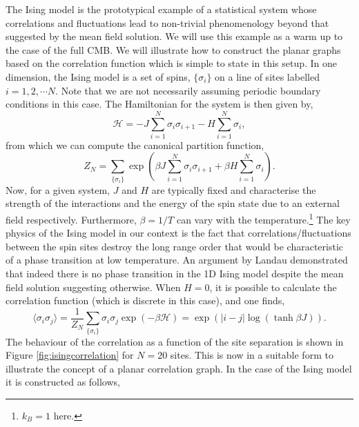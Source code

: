 \documentclass[11pt]{article}
\numberwithin{equation}{section}
\numberwithin{figure}{section}
\numberwithin{table}{section}
\numberwithin{definition}{section}
\newcommand{\Abs}[1]{\left| #1 \right|}
\begin{document}
The Ising model is the prototypical example of a statistical system whose correlations and fluctuations lead to non-trivial phenomenology beyond that suggested by the mean field solution. We will use this example as a warm up to the case of the full CMB. We will illustrate how to construct the planar graphs based on the correlation function which is simple to state in this setup. In one dimension, the Ising model is a set of spins, $\{\sigma_i\}$ on a line of sites labelled $i = 1, 2, \cdots N$. Note that we are not necessarily assuming periodic boundary conditions in this case. The Hamiltonian for the system is then given by,
\begin{equation}
\mathcal{H} = -J \sum_{i = 1}^{N}{\sigma_i \sigma_{i + 1}} - H \sum_{i = 1}^{N}{\sigma_i},
\end{equation}
from which we can compute the canonical partition function,
\begin{equation}
Z_N = \sum_{\{\sigma_i\}}{\exp\left(\beta J \sum_{i = 1}^{N}{\sigma_i \sigma_{i + 1}} + \beta H\sum_{i = 1}^{N}{\sigma_i}\right)}.
\end{equation}
Now, for a given system, $J$ and $H$ are typically fixed and characterise the strength of the interactions and the energy of the spin state due to an external field respectively. Furthermore, $\beta = 1/T$ can vary with the temperature.\footnote{$k_B = 1$ here.} The key physics of the Ising model in our context is the fact that correlations/fluctuations between the spin sites destroy the long range order that would be characteristic of a phase transition at low temperature. An argument by Landau demonstrated that indeed there is no phase transition in the 1D Ising model despite the mean field solution suggesting otherwise. When $H = 0$, it is possible to calculate the correlation function (which is discrete in this case), and one finds,
\begin{equation}
\langle \sigma_i \sigma_j \rangle = \frac{1}{Z_N}\sum_{\{\sigma_i\}}{\sigma_i \sigma_j \exp(-\beta \mathcal{H})} = \exp\left(\Abs{i - j}\log(\tanh\beta J)\right).
\end{equation}
The behaviour of the correlation as a function of the site separation is shown in Figure \ref{fig:isingcorrelation} for $N = 20$ sites. This is now in a suitable form to illustrate the concept of a planar correlation graph. In the case of the Ising model it is constructed as follows,
\end{document}
